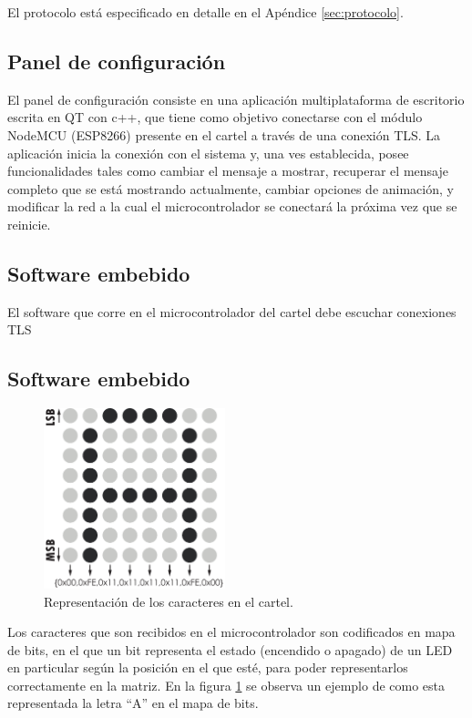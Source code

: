 El protocolo está especificado en detalle en el Apéndice \ref{sec:protocolo}.


\subsection{Panel de configuración}
El panel de configuración consiste en una aplicación multiplataforma de escritorio escrita en QT con c++, que tiene como objetivo conectarse con el módulo NodeMCU (ESP8266) presente en el cartel a través de una conexión TLS.
La aplicación inicia la conexión con el sistema y, una ves establecida, posee funcionalidades tales como cambiar el mensaje a mostrar, recuperar el mensaje completo que se está mostrando actualmente, cambiar opciones de animación, y modificar la red a la cual el microcontrolador se conectará la próxima vez que se reinicie.
\subsection{Software embebido}
El software que corre en el microcontrolador del cartel debe escuchar conexiones TLS

\clearpage

\subsection{Software embebido}
\begin{figure}
    \centering
    \includegraphics[width=0.47\textwidth]{imagenes/codificacionAscii.pdf}
    \caption{Representación de los caracteres en el cartel.}
    \label{fig:repAscii}
\end{figure}

Los caracteres que son recibidos en el microcontrolador son codificados en mapa de bits, en el que un bit representa el estado (encendido o apagado) de un LED en particular según la posición en el que esté, para poder representarlos correctamente en la matriz. En la figura \ref{fig:repAscii} se observa un ejemplo de como esta representada la letra \enquote{A} en el mapa de bits.

